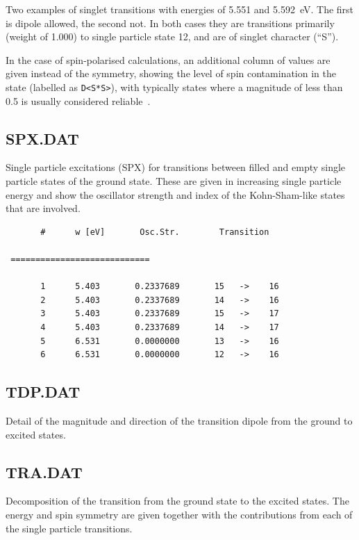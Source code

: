 Two examples of singlet transitions with energies of 5.551 and 5.592~eV. The
first is dipole allowed, the second not. In both cases they are transitions
primarily (weight of 1.000) to single particle state 12, and are of singlet
character (``S'').

In the case of spin-polarised calculations, an additional column of values are
given instead of the symmetry, showing the level of spin contamination in the
state (labelled as \verb|D<S*S>|), with typically states where a magnitude of
less than 0.5 is usually considered reliable~\cite{garcia14Thesis}.

\subsection{SPX.DAT}

Single particle excitations (SPX) for transitions between filled and empty single
particle states of the ground state. These are given in increasing single
particle energy and show the oscillator strength and index of the Kohn-Sham-like
states that are involved.

\begin{verbatim}
       #      w [eV]       Osc.Str.        Transition

 ============================

       1      5.403       0.2337689       15   ->    16
       2      5.403       0.2337689       14   ->    16
       3      5.403       0.2337689       15   ->    17
       4      5.403       0.2337689       14   ->    17
       5      6.531       0.0000000       13   ->    16
       6      6.531       0.0000000       12   ->    16
\end{verbatim}

\subsection{TDP.DAT}

Detail of the magnitude and direction of the transition dipole from the ground
to excited states.

\subsection{TRA.DAT}

Decomposition of the transition from the ground state to the excited states. The
energy and spin symmetry are given together with the contributions from each of
the single particle transitions.

